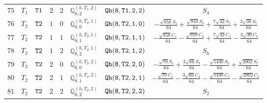 \documentclass[fleqn,8pt]{jsarticle}
\begin{document}
\begin{table}[ht!]
\begin{center}
\begin{tabular}{cccccccc}
$ 75 $ & $ T_{1} $ & $ {\tt T1} $ & $ 2 $ & $ 2 $ & $ \mathbb{Q}_{8,2}^{(h,T_{1},2)} $ & $ {\tt Qh(8,T1,2,2)} $ & $ S_{4} $ \\
$ 76 $ & $ T_{2} $ & $ {\tt T2} $ & $ 1 $ & $ 0 $ & $ \mathbb{Q}_{8,0}^{(h,T_{2},1)} $ & $ {\tt Qh(8,T2,1,0)} $ & $ - \frac{\sqrt{858} S_{1}}{64} + \frac{\sqrt{910} S_{3}}{64} + \frac{7 \sqrt{42} S_{5}}{64} + \frac{3 \sqrt{30} S_{7}}{64} $ \\
$ 77 $ & $ T_{2} $ & $ {\tt T2} $ & $ 1 $ & $ 1 $ & $ \mathbb{Q}_{8,1}^{(h,T_{2},1)} $ & $ {\tt Qh(8,T2,1,1)} $ & $ - \frac{\sqrt{858} C_{1}}{64} - \frac{\sqrt{910} C_{3}}{64} + \frac{7 \sqrt{42} C_{5}}{64} - \frac{3 \sqrt{30} C_{7}}{64} $ \\
$ 78 $ & $ T_{2} $ & $ {\tt T2} $ & $ 1 $ & $ 2 $ & $ \mathbb{Q}_{8,2}^{(h,T_{2},1)} $ & $ {\tt Qh(8,T2,1,2)} $ & $ S_{6} $ \\
$ 79 $ & $ T_{2} $ & $ {\tt T2} $ & $ 2 $ & $ 0 $ & $ \mathbb{Q}_{8,0}^{(h,T_{2},2)} $ & $ {\tt Qh(8,T2,2,0)} $ & $ - \frac{\sqrt{70} S_{1}}{64} + \frac{3 \sqrt{66} S_{3}}{64} - \frac{\sqrt{1430} S_{5}}{64} + \frac{\sqrt{2002} S_{7}}{64} $ \\
$ 80 $ & $ T_{2} $ & $ {\tt T2} $ & $ 2 $ & $ 1 $ & $ \mathbb{Q}_{8,1}^{(h,T_{2},2)} $ & $ {\tt Qh(8,T2,2,1)} $ & $ - \frac{\sqrt{70} C_{1}}{64} - \frac{3 \sqrt{66} C_{3}}{64} - \frac{\sqrt{1430} C_{5}}{64} - \frac{\sqrt{2002} C_{7}}{64} $ \\
$ 81 $ & $ T_{2} $ & $ {\tt T2} $ & $ 2 $ & $ 2 $ & $ \mathbb{Q}_{8,2}^{(h,T_{2},2)} $ & $ {\tt Qh(8,T2,2,2)} $ & $ S_{2} $ \\
 \hline \hline
\end{tabular}
\end{center}
\end{table}
\end{document}
